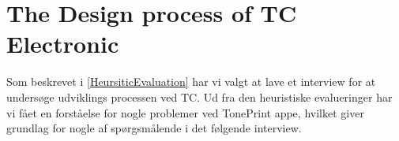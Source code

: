 \chapter{The Design process of TC Electronic}
\label{Interview}
Som beskrevet i \autoref{HeursiticEvaluation} har vi valgt at lave et interview for at undersøge udviklings processen ved TC. Ud fra den heuristiske evalueringer har vi fået en forståelse for nogle problemer ved TonePrint appe, hvilket giver grundlag for nogle af spørgsmålende i det følgende interview.



